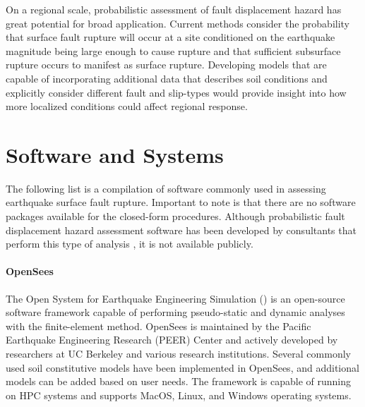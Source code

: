 On a regional scale, probabilistic assessment of fault displacement hazard has great potential for broad application. Current methods consider the probability that surface fault rupture will occur at a site conditioned on the earthquake magnitude being large enough to cause rupture and that sufficient subsurface rupture occurs to manifest as surface rupture. Developing models that are capable of incorporating additional data that describes soil conditions and explicitly consider different fault and slip-types would provide insight into how more localized conditions could affect regional response.


\section{Software and Systems}
\label{sec:eq_surface_rup_tools}

The following list is a compilation of software commonly used in assessing earthquake surface fault rupture. Important to note is that there are no software packages available for the closed-form procedures. Although probabilistic fault displacement hazard assessment software has been developed by consultants that perform this type of analysis \citep{wells2014probabilistic}, it is not available publicly.

\paragraph{OpenSees}
The Open System for Earthquake Engineering Simulation () is an open-source software framework capable of performing pseudo-static and dynamic analyses with the finite-element method. OpenSees is maintained by the Pacific Earthquake Engineering Research (PEER) Center and actively developed by researchers at UC Berkeley and various research institutions. Several commonly used soil constitutive models have been implemented in OpenSees, and additional models can be added based on user needs. The framework is capable of running on HPC systems and supports MacOS, Linux, and Windows operating systems.

